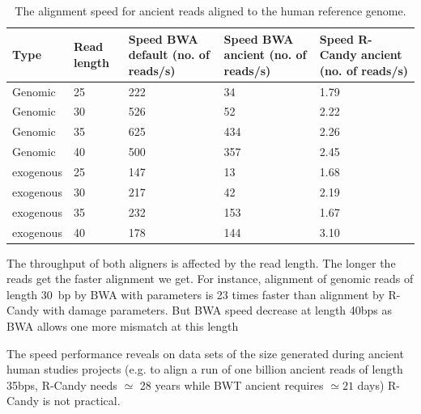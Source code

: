 \documentclass[11pt,a4paper]{report}
\begin{document}
\begin{table}[H]
  \begin{tabular}{ |  p{2cm} | p{2cm} | p{2cm} | p{2cm} |p{2cm} | }
    \hline
  	\textbf{Type} & \textbf{Read length }&\textbf{Speed BWA  
  		default (no. of reads/s) }
  	&\textbf{Speed BWA ancient (no. of reads/s)} 
  	& \textbf{Speed R-Candy ancient (no. of reads/s)}\\ \hline
 	  Genomic    & 25  & 222 &  34   &  1.79 \\ \hline
      Genomic    & 30  & 526 &  52   &  2.22 \\ \hline
      Genomic    & 35  & 625 &  434   &  2.26 \\ \hline
 	  Genomic	 & 40  & 500 &  357   &  2.45 \\ \hline
 	  exogenous  & 25  & 147 &  13   &  1.68 \\ \hline
      exogenous  & 30  & 217 &  42   &  2.19 \\ \hline
 	  exogenous  & 35  & 232 &  153   &  1.67 \\ \hline
 	  exogenous  & 40  & 178 &  144   &  3.10 \\ \hline
   \end{tabular}
\caption{The alignment speed for ancient reads aligned to 
the human reference genome.}
\label{speed-RG}
\end{table}

The throughput of both aligners is affected by the read length.  The
longer the reads get the faster alignment we get.  For instance,
alignment of genomic reads of length 30~bp by BWA with 
parameters is 23 times faster than alignment by R-Candy with damage
parameters.  But BWA speed decrease at length 40bps as BWA allows one
more mismatch at this length

The speed performance reveals on data sets of the size generated 
during ancient human studies projects (e.g. to align a run of one 
billion ancient reads of length 35bps, R-Candy needs $\simeq $ 28 years while 
BWT ancient requires $\simeq 21$ days) R-Candy is not practical.
\end{document}
